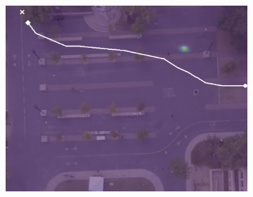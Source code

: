\documentclass[letterpaper,10pt,conference]{ieeeconf}
\begin{document}
\begin{figure}[t!]
\begin{subfigure}[t]{0.48\textwidth}
\begin{minipage}[c]{0.3\linewidth}
			\includegraphics[width=\linewidth]{./figures/bookstore/lstm_1_2_t=360.jpg}
		\end{minipage}
	

\end{subfigure}
\end{figure}
\end{document}
